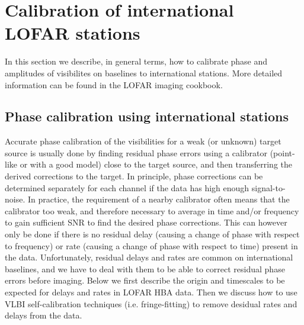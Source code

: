 \documentclass[graybox]{svmult}
\begin{document}
\section{Calibration of international LOFAR stations}
In this section we describe, in general terms, how to calibrate phase
and amplitudes of visibilites on baselines to international stations.
More detailed information can be found in the LOFAR imaging cookbook.

\subsection{Phase calibration using international stations} 
Accurate phase calibration of the visibilities for a weak (or unknown) target
source is usually done by finding residual phase errors using a calibrator
(point-like or with a good model) close to the target source, and then
transferring the derived corrections to the target.  In principle, phase
corrections can be determined separately for each channel if the data has high
enough signal-to-noise. In practice, the requirement of a nearby calibrator
often means that the calibrator too weak, and therefore necessary to average in
time and/or frequency to gain sufficient SNR to find the desired phase
corrections.  This can however only be done if there is no residual delay
(causing a change of phase with respect to frequency) or rate (causing a change
of phase with respect to time) present in the data.  Unfortunately, residual
delays and rates are common on international baselines, and we have to deal
with them to be able to correct residual phase errors before imaging. Below we
first describe the origin and timescales to be expected for delays and rates in
LOFAR HBA data. Then we discuss how to use VLBI self-calibration techniques
(i.e. fringe-fitting) to remove desidual rates and delays from the data.
\end{document}
